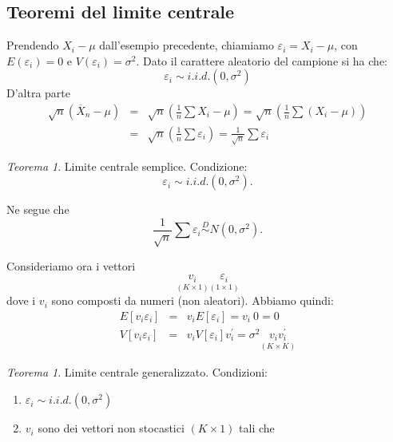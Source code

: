 \documentclass[a4paper]{report}
\newcounter{ese}
\theoremstyle{remark}
\newcounter{theor}
\newtheorem{theorem}[theor]{Teorema}
\begin{document}
\subsection{Teoremi del limite centrale}

Prendendo $X_{i}-\mu $ dall'esempio precedente, chiamiamo $\varepsilon
_{i}=X_{i}-\mu $, con $E(\varepsilon _{i})=0$ e $V(\varepsilon _{i})=\sigma
^{2}$. Dato il carattere aleatorio del campione si ha che: 
\begin{equation*}
\varepsilon _{i}\sim i.i.d.(0,\sigma ^{2})
\end{equation*}%
D'altra parte 
\begin{eqnarray*}
\sqrt{n}\left( \overline{X}_{n}-\mu \right) &=&\sqrt{n}\left( \frac{1}{n}%
\sum X_{i}-\mu \right) =\sqrt{n}\left( \frac{1}{n}\sum \left( X_{i}-\mu
\right) \right) \\
&=&\sqrt{n}\left( \frac{1}{n}\sum \varepsilon _{i}\right) =\frac{1}{\sqrt{n}}%
\sum \varepsilon _{i}
\end{eqnarray*}

\begin{theorem}
Limite centrale semplice. Condizione:%
\begin{equation*}
\varepsilon _{i}\sim i.i.d.(0,\sigma ^{2}).
\end{equation*}

Ne segue che 
\begin{equation*}
\frac{1}{\sqrt{n}}\sum \varepsilon _{i}\overset{D}{\sim }N\left( 0,\sigma
^{2}\right) .
\end{equation*}
\end{theorem}

\noindent Consideriamo ora i vettori 
\begin{equation*}
\underset{(K\times 1)}{v_{i}}\underset{(1\times 1)}{\varepsilon _{i}}
\end{equation*}%
dove i $v_{i}$ sono composti da numeri (non aleatori). Abbiamo quindi: 
\begin{eqnarray*}
E[v_{i}\varepsilon _{i}] &=&v_{i}E[\varepsilon _{i}]=v_{i}\ 0=0 \\
V[v_{i}\varepsilon _{i}] &=&v_{i}V[\varepsilon _{i}]v_{i}^{\prime }=\sigma
^{2}\underset{(K\times K)}{v_{i}v_{i}^{\prime }}
\end{eqnarray*}

\begin{theorem}
Limite centrale generalizzato. Condizioni:
\end{theorem}

\begin{enumerate}
\item $\varepsilon _{i}\sim i.i.d.(0,\sigma ^{2})$

\item $v_{i}$ sono dei vettori non stocastici $(K\times 1)$ tali che
\end{enumerate}
\end{document}
